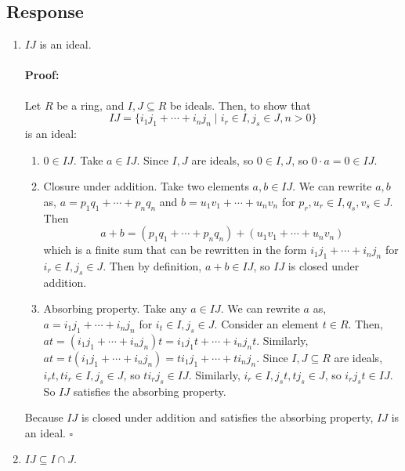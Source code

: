 \documentclass [12pt] {article}
\newenvironment{proof}{\paragraph{Proof:}}{\hfill$\square$}
\begin{document}
\subsection*{Response}
\begin{enumerate}
    \item $IJ$ is an ideal. 
        \vspace{-1em}
        \begin{proof}
            Let $R$ be a ring, and $I, J \subseteq R$ be ideals. Then, to show that 
            \[IJ = \{ i_1 j_1 + \cdots + i_n j_n \mid i_r \in I, j_s \in J, n>0 \}\] 
            is an ideal:
            \begin{enumerate}
                \item $0 \in IJ$. Take $a \in IJ$. Since $I, J$ are ideals, so $0 \in I, J$, so 
                    $0 \cdot a = 0 \in IJ$.
                \item Closure under addition. Take two elements $a, b \in IJ$. We can rewrite $a, b$ 
                    as,
                    $a = p_1 q_1 + \cdots + p_n q_n$ and $b = u_1 v_1 + \cdots + u_n v_n$ for $p_r,
                    u_r \in I, q_s, v_s \in J$. Then
                    \[
                        a + b = (p_1 q_1 + \cdots + p_n q_n) + (u_1 v_1 + \cdots + u_n v_n)
                    \]
                    which is a finite sum that can be rewritten in the form 
                    $i_1 j_1 + \cdots + i_n j_n$ for $i_r \in I, j_s \in J$. Then by definition, 
                    $a + b \in IJ$, so $IJ$ is closed under addition.
                \item Absorbing property. Take any $a \in IJ$. We can
                    rewrite $a$ as, $a = i_1 j_1 + \cdots + i_n j_n$ for $i_t \in I, j_s \in J$. 
                    Consider an element $t \in R$. Then, 
                    $at = (i_1 j_1 + \cdots + i_n j_n) t = i_1 j_1 t + \cdots + i_n j_n t$. Similarly,
                    $at = t (i_1 j_1 + \cdots + i_n j_n) = t i_1 j_1 + \cdots + t i_n j_n$. Since 
                    $I, J \subseteq R$ are ideals, $i_r t, t i_r \in I, j_s \in J$, so
                    $t i_r j_s \in IJ$. Similarly, $i_r \in I, j_s t, t j_s \in J$, so
                    $i_r j_s t \in IJ$. So $IJ$ satisfies the absorbing property.
            \end{enumerate}
            Because $IJ$ is closed under addition and satisfies the absorbing property, $IJ$ is an 
            ideal. 
        \end{proof}
    \item $IJ \subseteq I \cap J$. 

\end{enumerate}
\end{document}
